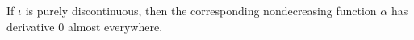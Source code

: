 If $\iota$ is purely discontinuous, then the corresponding nondecreasing function $\alpha$ has derivative $0$ almost everywhere.
